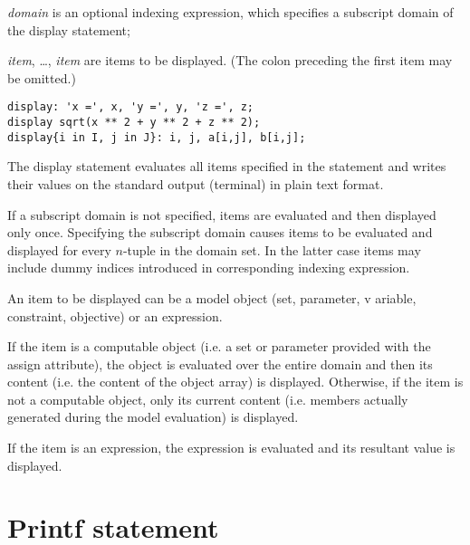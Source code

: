 \documentclass[11pt]{report}
\def\para#1{\noindent{\bf#1}}
\begin{document}
\noindent
{}

\medskip

\noindent
{\it domain} is an optional indexing expression, which specifies
a subscript domain of the display statement;

\noindent
{\it item}, \dots, {\it item} are items to be displayed. (The colon
preceding the first item may be omitted.)

\para{Examples}

\begin{verbatim}
display: 'x =', x, 'y =', y, 'z =', z;
display sqrt(x ** 2 + y ** 2 + z ** 2);
display{i in I, j in J}: i, j, a[i,j], b[i,j];
\end{verbatim}

The display statement evaluates all items specified in the statement
and writes their values on the standard output (terminal) in plain text
format.

If a subscript domain is not specified, items are evaluated and then
displayed only once. Specifying the subscript domain causes items to be
evaluated and displayed for every $n$-tuple in the domain set. In the
latter case items may include dummy indices introduced in corresponding
indexing expression.

An item to be displayed can be a model object (set, parameter, v
ariable, constraint, objective) or an expression.

If the item is a computable object (i.e. a set or parameter provided
with the assign attribute), the object is evaluated over the entire
domain and then its content (i.e. the content of the object array) is
displayed. Otherwise, if the item is not a computable object, only its
current content (i.e. members actually generated during the model
evaluation) is displayed.

If the item is an expression, the expression is evaluated and its
resultant value is displayed.

\section{Printf statement}

\noindent
{}
\end{document}
